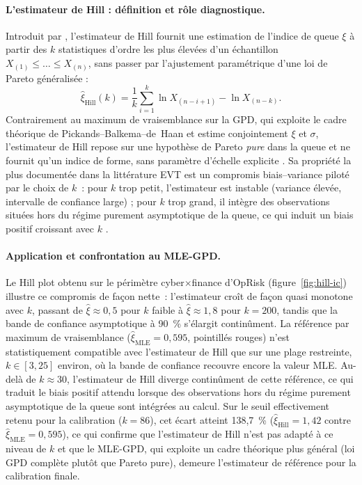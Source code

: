 \documentclass[11pt,a4paper]{article}
\theoremstyle{navystyle}
\theoremstyle{navydef}
\begin{document}
\paragraph{L'estimateur de Hill : définition et rôle diagnostique.}
Introduit par \citet{Hill1975}, l'estimateur de Hill fournit une estimation
de l'indice de queue $\xi$ à partir des $k$ statistiques d'ordre les plus
élevées d'un échantillon $X_{(1)} \leq \dots \leq X_{(n)}$, sans passer par
l'ajustement paramétrique d'une loi de Pareto généralisée :
\begin{equation}
\hat{\xi}_{\text{Hill}}(k) = \frac{1}{k}\sum_{i=1}^{k}
\ln X_{(n-i+1)} - \ln X_{(n-k)}.
\label{eq:hill}
\end{equation}
Contrairement au maximum de vraisemblance sur la GPD, qui exploite le cadre
théorique de Pickands--Balkema--de~Haan et estime conjointement $\xi$ et
$\sigma$, l'estimateur de Hill repose sur une hypothèse de Pareto \emph{pure}
dans la queue et ne fournit qu'un indice de forme, sans paramètre d'échelle
explicite \citep{Beirlant2004}. Sa propriété la plus documentée dans la
littérature EVT est un compromis biais--variance piloté par le choix de
$k$~: pour $k$ trop petit, l'estimateur est instable (variance élevée,
intervalle de confiance large) ; pour $k$ trop grand, il intègre des
observations situées hors du régime purement asymptotique de la queue, ce
qui induit un biais positif croissant avec $k$ \citep{Embrechts1997,
Beirlant2004}.

\paragraph{Application et confrontation au MLE-GPD.} Le Hill plot obtenu sur
le périmètre cyber$\times$finance d'OpRisk (figure~\ref{fig:hill-ic})
illustre ce compromis de façon nette~: l'estimateur croît de façon quasi
monotone avec $k$, passant de $\hat{\xi} \approx 0{,}5$ pour $k$ faible à
$\hat{\xi} \approx 1{,}8$ pour $k = 200$, tandis que la bande de confiance
asymptotique à 90~\% s'élargit continûment. La référence par maximum de
vraisemblance ($\hat{\xi}_{\text{MLE}} = 0{,}595$, pointillés rouges) n'est
statistiquement compatible avec l'estimateur de Hill que sur une plage
restreinte, $k \in [3, 25]$ environ, où la bande de confiance recouvre
encore la valeur MLE. Au-delà de $k \approx 30$, l'estimateur de Hill
diverge continûment de cette référence, ce qui traduit le biais positif
attendu lorsque des observations hors du régime purement asymptotique de la
queue sont intégrées au calcul. Sur le seuil effectivement retenu pour la
calibration ($k = 86$), cet écart atteint 138{,}7~\%
($\hat{\xi}_{\text{Hill}} = 1{,}42$ contre $\hat{\xi}_{\text{MLE}} = 0{,}595$),
ce qui confirme que l'estimateur de Hill n'est pas adapté à ce niveau de
$k$ et que le MLE-GPD, qui exploite un cadre théorique plus général
(loi GPD complète plutôt que Pareto pure), demeure l'estimateur de
référence pour la calibration finale.
\end{document}
